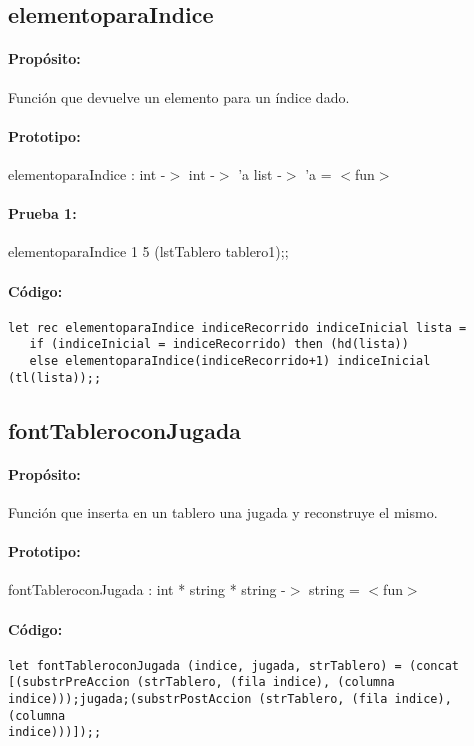 \subsection{elementoparaIndice}

\paragraph{Propósito:} Función que devuelve un elemento para un índice dado.
\paragraph{Prototipo:} elementoparaIndice : int -$>$ int -$>$ 'a list -$>$ 'a = $<$fun$>$
\paragraph{Prueba 1:} elementoparaIndice 1 5 (lstTablero tablero1);;
\paragraph{Código:}
\begin{verbatim}
let rec elementoparaIndice indiceRecorrido indiceInicial lista = 
   if (indiceInicial = indiceRecorrido) then (hd(lista))
   else elementoparaIndice(indiceRecorrido+1) indiceInicial (tl(lista));;
\end{verbatim}

\subsection{fontTableroconJugada}

\paragraph{Propósito:} Función que inserta en un tablero una jugada y reconstruye el mismo.
\paragraph{Prototipo:} fontTableroconJugada : int * string * string -$>$ string = $<$fun$>$
\paragraph{Código:}
\begin{verbatim}
let fontTableroconJugada (indice, jugada, strTablero) = (concat
[(substrPreAccion (strTablero, (fila indice), (columna
indice)));jugada;(substrPostAccion (strTablero, (fila indice), (columna
indice)))]);;
\end{verbatim}

